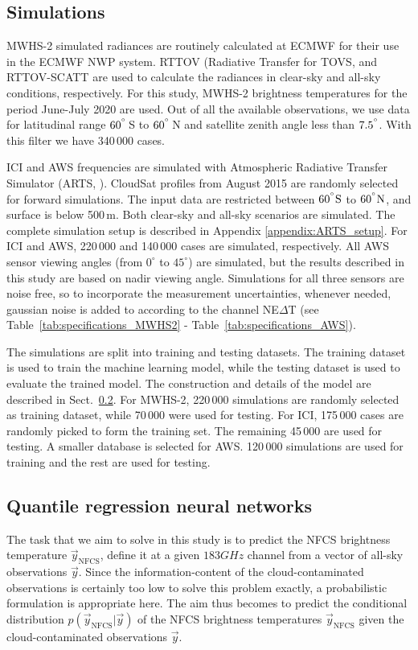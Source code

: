 \documentclass[amt, manuscript]{copernicus}
\newcommand{\todo}[1]{{\color{red} #1}}
\newcommand{\ynfcs}{\vec{y}_\text{NFCS}}
\newcommand{\y}{\vec{y}}
\begin{document}
\subsection{Simulations}
%
MWHS-2 simulated radiances are routinely calculated at ECMWF for their use in the ECMWF NWP system. RTTOV (Radiative Transfer for TOVS, \citet{saunders2018update} and RTTOV-SCATT \citep{bauer2006rttovscat} are used to calculate the radiances in clear-sky and all-sky conditions, respectively. For this study, MWHS-2 brightness temperatures for the period June-July 2020 are used. Out of all the available observations, we use data for latitudinal range $60^{^{\circ}}$\,S to $60^{^{\circ}}$\,N and satellite zenith angle less than $7.5^{^{\circ}}$. With this filter we have 340\,000 cases.

ICI and AWS frequencies are simulated with Atmospheric Radiative Transfer
Simulator (ARTS, \citet{buehler:artst:18}). CloudSat
\citep{Stephens2002cloudsat} profiles from August 2015 are randomly selected for
forward simulations. The input data are restricted between $60\unit{^{\degree}S}$ to
$60\unit{^{\degree}N}$, and surface is below 500\,m. Both clear-sky and all-sky
scenarios are simulated. The complete simulation setup is described in Appendix
\ref{appendix:ARTS_setup}. For ICI and AWS, 220\,000 and 140\,000 cases are
simulated, respectively. All AWS sensor viewing angles (from $0^\circ$ to
$45^\circ$) are simulated, but the results described in this study are based on
nadir viewing angle. Simulations for all three sensors are noise free, so to
incorporate the measurement uncertainties, whenever needed, gaussian noise is
added to according to the channel NE$\Delta$T (see
Table~\ref{tab:specifications_MWHS2} - Table~\ref{tab:specifications_AWS}).

The simulations are split into training and testing datasets. The training dataset is used to train the machine learning model, while the testing dataset is used to evaluate the trained model. The construction and details of the model are described in Sect.~\ref{sec:QRNN}. For MWHS-2, 220\,000 simulations are randomly selected as training dataset, while 70\,000 were used for testing. For ICI, 175\,000 cases are randomly picked to form the training set. The remaining 45\,000 are used for testing. A smaller database is selected for AWS. 120\,000 simulations are used for training and the rest are used for testing.

\subsection{Quantile regression neural networks}
\label{sec:QRNN}
%
The task that we aim to solve in this study is to predict the NFCS brightness
temperature \todo{$\ynfcs$, define it} at a given $183\unit{GHz}$ channel from a vector of
all-sky observations $\y$. Since the information-content of the
cloud-contaminated observations is certainly too low to solve this problem
exactly, a probabilistic formulation is appropriate here. The aim thus becomes
to predict the conditional distribution $p(\ynfcs | \y)$ of the NFCS brightness
temperatures $\ynfcs$ given the cloud-contaminated observations $\y$.
\end{document}
